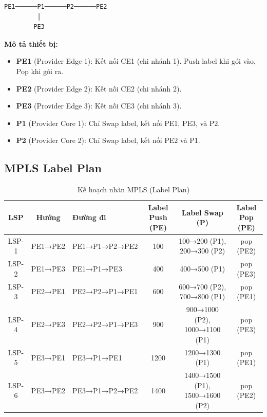 \begin{verbatim}
PE1──────P1──────P2──────PE2
         │
        PE3
\end{verbatim}

\textbf{Mô tả thiết bị:}
\begin{itemize}
    \item \textbf{PE1} (Provider Edge 1): Kết nối CE1 (chi nhánh 1). Push label khi gói vào, Pop khi gói ra.
    \item \textbf{PE2} (Provider Edge 2): Kết nối CE2 (chi nhánh 2).
    \item \textbf{PE3} (Provider Edge 3): Kết nối CE3 (chi nhánh 3).
    \item \textbf{P1} (Provider Core 1): Chỉ Swap label, kết nối PE1, PE3, và P2.
    \item \textbf{P2} (Provider Core 2): Chỉ Swap label, kết nối PE2 và P1.
\end{itemize}

\subsection{MPLS Label Plan}

\begin{table}[htbp]
    \centering
    \caption{Kế hoạch nhãn MPLS (Label Plan)}
    \vspace{0.2cm}
    \begin{tabularx}{\textwidth}{|c|c|>{\raggedright\arraybackslash}X|c|c|c|}
        \hline
        \textbf{LSP} & \textbf{Hướng} & \textbf{Đường đi} & \textbf{Label Push (PE)} & \textbf{Label Swap (P)} & \textbf{Label Pop (PE)} \\ \hline
        LSP-1 & PE1→PE2 & PE1→P1→P2→PE2 & 100 & 100→200 (P1), 200→300 (P2) & pop (PE2) \\ \hline
        LSP-2 & PE1→PE3 & PE1→P1→PE3 & 400 & 400→500 (P1) & pop (PE3) \\ \hline
        LSP-3 & PE2→PE1 & PE2→P2→P1→PE1 & 600 & 600→700 (P2), 700→800 (P1) & pop (PE1) \\ \hline
        LSP-4 & PE2→PE3 & PE2→P2→P1→PE3 & 900 & 900→1000 (P2), 1000→1100 (P1) & pop (PE3) \\ \hline
        LSP-5 & PE3→PE1 & PE3→P1→PE1 & 1200 & 1200→1300 (P1) & pop (PE1) \\ \hline
        LSP-6 & PE3→PE2 & PE3→P1→P2→PE2 & 1400 & 1400→1500 (P1), 1500→1600 (P2) & pop (PE2) \\ \hline
    \end{tabularx}
\end{table}

